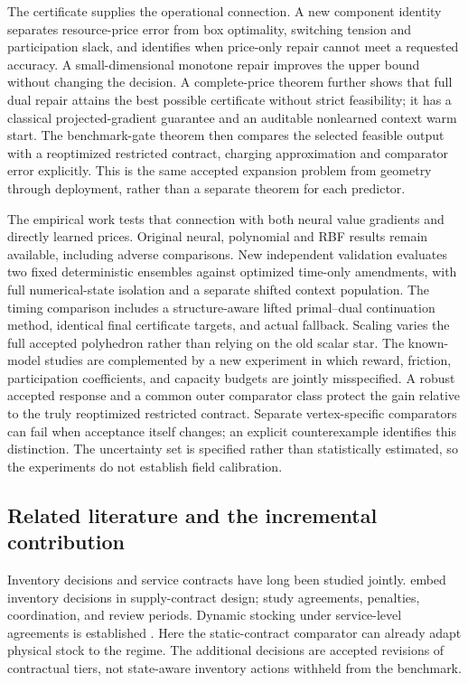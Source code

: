 \documentclass[11pt,letterpaper]{article}
\theoremstyle{definition}
\newcommand{\1}{\mathbf 1}
\begin{document}
The certificate supplies the operational connection. A new component identity separates resource-price error from box optimality, switching tension and participation slack, and identifies when price-only repair cannot meet a requested accuracy. A small-dimensional monotone repair improves the upper bound without changing the decision. A complete-price theorem further shows that full dual repair attains the best possible certificate without strict feasibility; it has a classical projected-gradient guarantee and an auditable nonlearned context warm start. The benchmark-gate theorem then compares the selected feasible output with a reoptimized restricted contract, charging approximation and comparator error explicitly. This is the same accepted expansion problem from geometry through deployment, rather than a separate theorem for each predictor.

The empirical work tests that connection with both neural value gradients and directly learned prices. Original neural, polynomial and RBF results remain available, including adverse comparisons. New independent validation evaluates two fixed deterministic ensembles against optimized time-only amendments, with full numerical-state isolation and a separate shifted context population. The timing comparison includes a structure-aware lifted primal--dual continuation method, identical final certificate targets, and actual fallback. Scaling varies the full accepted polyhedron rather than relying on the old scalar star. The known-model studies are complemented by a new experiment in which reward, friction, participation coefficients, and capacity budgets are jointly misspecified. A robust accepted response and a common outer comparator class protect the gain relative to the truly reoptimized restricted contract. Separate vertex-specific comparators can fail when acceptance itself changes; an explicit counterexample identifies this distinction. The uncertainty set is specified rather than statistically estimated, so the experiments do not establish field calibration.
\subsection{Related literature and the incremental contribution}
Inventory decisions and service contracts have long been studied jointly. \citet{Henig1997} embed inventory decisions in supply-contract design; \citet{LiangAtkins2013,Sieke2012,Katok2008} study agreements, penalties, coordination, and review periods. Dynamic stocking under service-level agreements is established \citep{Hosseinifard2022,Caggiano2007,Abbasi2022}. Here the static-contract comparator can already adapt physical stock to the regime. The additional decisions are accepted revisions of contractual tiers, not state-aware inventory actions withheld from the benchmark.
\end{document}

